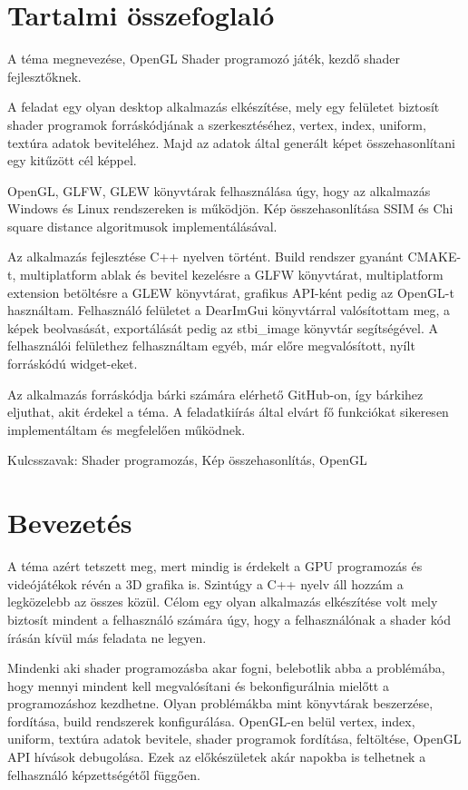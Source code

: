 \chapter*{Tartalmi összefoglaló}

A téma megnevezése, OpenGL Shader programozó játék, kezdő shader fejlesztőknek.

A feladat egy olyan desktop alkalmazás elkészítése, mely egy felületet biztosít shader programok forráskódjának a szerkesztéséhez, vertex, index, uniform, textúra adatok beviteléhez. Majd az adatok által generált képet összehasonlítani egy kitűzött cél képpel.

OpenGL, GLFW, GLEW könyvtárak felhasználása úgy, hogy az alkalmazás Windows és Linux rendszereken is működjön. Kép összehasonlítása SSIM és Chi square distance algoritmusok implementálásával.

Az alkalmazás fejlesztése C++ nyelven történt. Build rendszer gyanánt CMAKE-t, multiplatform ablak és bevitel kezelésre a GLFW könyvtárat, multiplatform extension betöltésre a GLEW könyvtárat, grafikus API-ként pedig az OpenGL-t használtam. Felhasználó felületet a DearImGui könyvtárral valósítottam meg, a képek beolvasását, exportálását pedig az stbi\_image könyvtár segítségével. A felhasználói felülethez felhasználtam egyéb, már előre megvalósított, nyílt forráskódú widget-eket.

Az alkalmazás forráskódja bárki számára elérhető GitHub-on, így bárkihez eljuthat, akit érdekel a téma. A feladatkiírás által elvárt fő funkciókat sikeresen implementáltam és megfelelően működnek. 

Kulcsszavak: Shader programozás, Kép összehasonlítás, OpenGL

\chapter*{Bevezetés}
A téma azért tetszett meg, mert mindig is érdekelt a GPU programozás és videójátékok révén a 3D grafika is. Szintúgy a C++ nyelv áll hozzám a legközelebb az összes közül. Célom egy olyan alkalmazás elkészítése volt mely biztosít mindent a felhasználó számára úgy, hogy a felhasználónak a shader kód írásán kívül más feladata ne legyen.

Mindenki aki shader programozásba akar fogni, belebotlik abba a problémába, hogy mennyi mindent kell megvalósítani és bekonfigurálnia mielőtt a programozáshoz kezdhetne. Olyan problémákba mint könyvtárak beszerzése, fordítása, build rendszerek konfigurálása. OpenGL-en belül vertex, index, uniform, textúra adatok bevitele, shader programok fordítása, feltöltése, OpenGL API hívások debugolása. Ezek az előkészületek akár napokba is telhetnek a felhasználó képzettségétől függően. 

